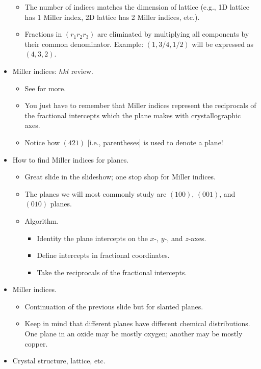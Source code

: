 \documentclass[../notes.tex]{subfiles}
\begin{document}
\begin{itemize}
\begin{itemize}
        \item The number of indices matches the dimension of lattice (e.g., 1D lattice has 1 Miller index, 2D lattice has 2 Miller indices, etc.).
        \item Fractions in $(r_1r_2r_3)$ are eliminated by multiplying all components by their common denominator. Example: $(1,3/4,1/2)$ will be expressed as $(4,3,2)$.
    \end{itemize}
    \item Miller indices: $hkl$ review.
    \begin{itemize}
        \item See \textcite{bib:CHEM26300Notes} for more.
        \item You just have to remember that Miller indices represent the reciprocals of the fractional intercepts which the plane makes with crystallographic axes.
        \item Notice how $(421)$ [i.e., parentheses] is used to denote a plane!
    \end{itemize}
    \item How to find Miller indices for planes.
    \begin{itemize}
        \item Great slide in the slideshow; one stop shop for Miller indices.
        \item The planes we will most commonly study are $(100)$, $(001)$, and $(010)$ planes.
        \item Algorithm.
        \begin{itemize}
            \item Identity the plane intercepts on the $x$-, $y$-, and $z$-axes.
            \item Define intercepts in fractional coordinates.
            \item Take the reciprocals of the fractional intercepts.
        \end{itemize}
    \end{itemize}
    \item Miller indices.
    \begin{itemize}
        \item Continuation of the previous slide but for slanted planes.
        \item Keep in mind that different planes have different chemical distributions. One plane in an oxide may be mostly oxygen; another may be mostly copper.
    \end{itemize}
    \item Crystal structure, lattice, etc.

\end{itemize}
\end{document}
